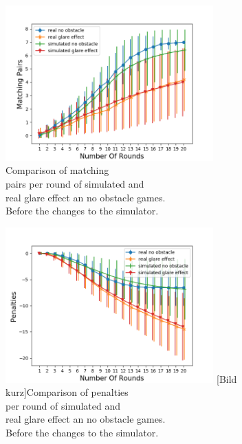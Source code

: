 \begin{minipage}{0.5\textwidth}
	\begin{figure}[H]
		\centering
		\includegraphics[width=8cm]{images/simulationInitial1.png}
		\caption[Bild kurz]{Comparison of matching \\\hspace{0\textwidth}pairs per round of simulated and \\\hspace{0\textwidth}real glare effect an no obstacle games.\\\hspace{0\textwidth} Before the changes to the simulator.}
		\label{fig:simIn1}
	\end{figure}
\end{minipage}
\begin{minipage}{0.5\textwidth}
	\centering
	\begin{figure}[H]
		\centering
		\includegraphics[width=8cm]{images/simulationInitial2.png}
		[Bild kurz]{Comparison of penalties\\\hspace{0\textwidth} per round of simulated and\\\hspace{0\textwidth} real glare effect an no obstacle games.\\\hspace{0\textwidth} Before the changes to the simulator.}
		\label{fig:simIn2}
	\end{figure}
\end{minipage}


